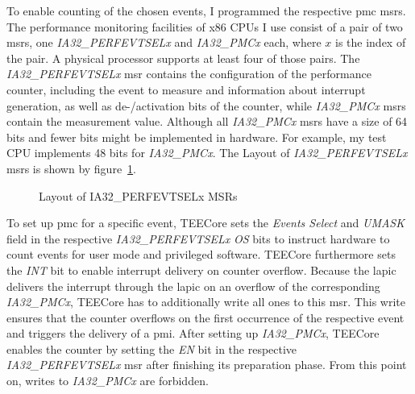 To enable counting of the chosen events, I programmed the respective \gls{pmc}
\glspl{msr}. The performance monitoring facilities of x86 CPUs I use consist
of a pair of two \glspl{msr}, one \textit{IA32\_PERFEVTSELx} and
\textit{IA32\_PMCx} each, where $x$ is the index of the pair. A physical
processor supports at least four of those pairs. The \textit{IA32\_PERFEVTSELx}
\gls{msr} contains the configuration of the performance counter, including the
event to measure and information about interrupt generation, as well as
de-/activation bits of the counter, while \textit{IA32\_PMCx} \glspl{msr}
contain the measurement value. Although all \textit{IA32\_PMCx} \glspl{msr} have
a size of 64 bits and fewer bits might be implemented in hardware. For example,
my test CPU implements 48 bits for \textit{IA32\_PMCx}. The Layout of
\textit{IA32\_PERFEVTSELx} \glspl{msr} is shown by
figure~\ref{fig:state:technical:perfsel}.

\begin{center}
  \begin{figure}
    \centering
    
    \caption{Layout of IA32\_PERFEVTSELx MSRs}
    \label{fig:state:technical:perfsel}
  \end{figure}
\end{center}

To set up \gls{pmc} for a specific event, TEECore sets the \textit{Events
Select} and \textit{UMASK} field in the respective \textit{IA32\_PERFEVTSELx}
\textit{OS} bits to instruct hardware to count events for user mode and
privileged software. TEECore furthermore sets the \textit{INT} bit to enable
interrupt delivery on counter overflow. Because the \gls{lapic} delivers the
interrupt through the \gls{lapic} on an overflow of the corresponding
\textit{IA32\_PMCx}, TEECore has to additionally write all ones to this
\gls{msr}. This write ensures that the counter overflows on the first
occurrence of the respective event and triggers the delivery of a \gls{pmi}.
After setting up \textit{IA32\_PMCx}, TEECore enables the counter by setting
the \textit{EN} bit in the respective \textit{IA32\_PERFEVTSELx} \gls{msr}
after finishing its preparation phase. From this point on, writes to
\textit{IA32\_PMCx} are forbidden.

